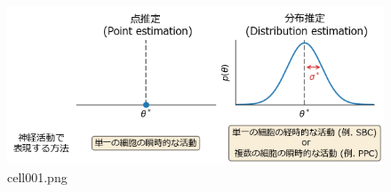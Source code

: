 \begin{figure}[ht]
	\centering
	\includegraphics[scale=0.8, max width=\linewidth]{./fig/bayesian-brain/neural-uncertainty-representation/cell001.png}
	\caption{cell001.png}
	\label{cell001.png}
\end{figure}